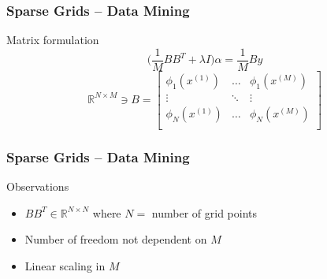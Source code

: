 \begin{frame}
  \frametitle{Sparse Grids -- Data Mining}
  \topline
  \vspace{-10px}
  \begin{block}{Matrix formulation}
    $$\big(\frac{1}{M} BB^T + \lambda I \big)\alpha = \frac{1}{M}By$$
    \vspace{15px}
    \[ \mathbb{R}^{N\times M} \ni B =
      \begin{bmatrix}
        \phi_1(x^{(1)}) & \dots & \phi_1(x^{(M)}) \\
        \vdots & \ddots & \vdots \\
        \phi_N(x^{(1)}) & \dots  & \phi_N(x^{(M)}) \\
      \end{bmatrix}
    \]
  \end{block}
\end{frame}


\begin{frame}
  \frametitle{Sparse Grids -- Data Mining}
  \topline
  \vspace{-10px}
  \begin{block}{Observations}
    \begin{itemize}
    \item $ BB^T \in \mathbb{R}^{N \times N}$ where $N =$ number of grid points
    \item Number of freedom not dependent on $M$
    \item Linear scaling in $M$
    \end{itemize}
  \end{block}
\end{frame}

